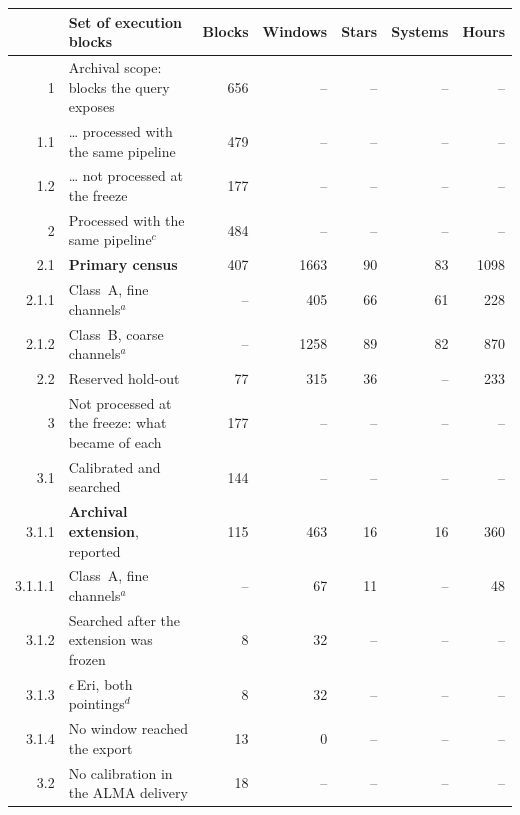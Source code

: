 \begin{tabular}{@{}r@{~}p{}rrrrr@{}}
\hline
 & Set of execution blocks & Blocks & Windows & Stars & Systems & Hours \\
\hline
1 & Archival scope: blocks the query exposes & 656 & -- & -- & -- & -- \\
1.1 & \hspace{0.8em}\ldots{} processed with the same pipeline & 479 & -- & -- & -- & -- \\
1.2 & \hspace{0.8em}\ldots{} not processed at the freeze & 177 & -- & -- & -- & -- \\
\hline
2 & Processed with the same pipeline$^{c}$ & 484 & -- & -- & -- & -- \\
2.1 & \hspace{0.8em}\textbf{Primary census} & 407 & 1663 & 90 & 83 & 1098 \\
2.1.1 & \hspace{1.6em}Class~A, fine channels$^{a}$ & -- & 405 & 66 & 61 & 228 \\
2.1.2 & \hspace{1.6em}Class~B, coarse channels$^{a}$ & -- & 1258 & 89 & 82 & 870 \\
2.2 & \hspace{0.8em}Reserved hold-out & 77 & 315 & 36 & -- & 233 \\
\hline
3 & Not processed at the freeze: what became of each & 177 & -- & -- & -- & -- \\
3.1 & \hspace{0.8em}Calibrated and searched & 144 & -- & -- & -- & -- \\
3.1.1 & \hspace{1.6em}\textbf{Archival extension}, reported & 115 & 463 & 16 & 16 & 360 \\
3.1.1.1 & \hspace{2.4em}Class~A, fine channels$^{a}$ & -- & 67 & 11 & -- & 48 \\
3.1.2 & \hspace{1.6em}Searched after the extension was frozen & 8 & 32 & -- & -- & -- \\
3.1.3 & \hspace{1.6em}$\epsilon$\,Eri, both pointings$^{d}$ & 8 & 32 & -- & -- & -- \\
3.1.4 & \hspace{1.6em}No window reached the export & 13 & 0 & -- & -- & -- \\
3.2 & \hspace{0.8em}No calibration in the ALMA delivery & 18 & -- & -- & -- & -- \\

\end{tabular}
